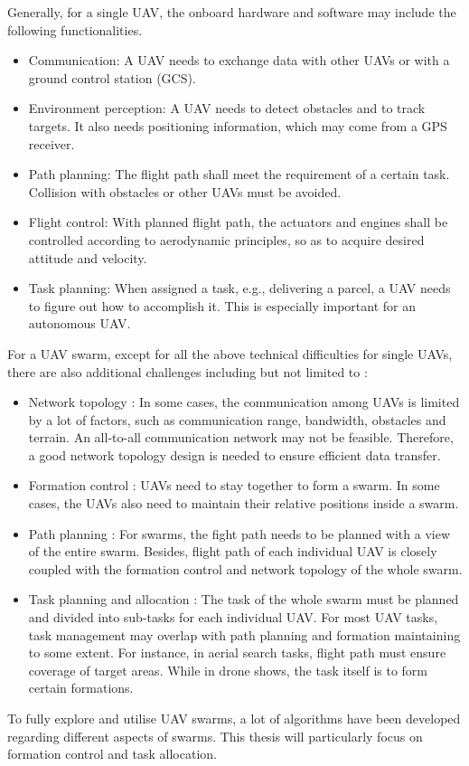 Generally, for a single UAV,
the onboard hardware and software may include the following functionalities.
\begin{itemize}
    \item Communication:
    A UAV needs to exchange data with other UAVs or with a ground control station (GCS).
    \item Environment perception:
    A UAV needs to detect obstacles and to track targets.
    It also needs positioning information, which may come from a GPS receiver.
    \item Path planning:
    The flight path shall meet the requirement of a certain task.
    Collision with obstacles or other UAVs must be avoided.
    \item Flight control:
    With planned flight path, the actuators and engines shall be controlled
    according to aerodynamic principles, so as to acquire desired attitude and velocity.
    \item Task planning:
    When assigned a task, e.g., delivering a parcel,
    a UAV needs to figure out how to accomplish it.
    This is especially important for an autonomous UAV.
\end{itemize}
For a UAV swarm, except for all the above technical difficulties for single UAVs,
there are also additional challenges including
but not limited to \parencite{Javed2024, Zhou2020, Brambilla2013}:
\begin{itemize}
  \item Network topology
  \parencite{Javed2024, Javaid2023, Chen2020, Campion2019, Brust2015}:
  In some cases, the communication among UAVs is limited by a lot of factors,
  such as communication range, bandwidth, obstacles and terrain.
  An all-to-all communication network may not be feasible.
  Therefore, a good network topology design is needed to ensure efficient data transfer.
  \item Formation control
  \parencite{Javed2024, Wan2023, Ouyang2023, Shahzad2023, Ma2022, Kamel2020}:
  UAVs need to stay together to form a swarm.
  In some cases, the UAVs also need to maintain their relative positions inside a swarm.
  \item Path planning
  \parencite{Javed2024, Dimakos2024, PuenteCastro2022}:
  For swarms, the fight path needs to be planned with a view of the entire swarm.
  Besides, flight path of each individual UAV is closely coupled with
  the formation control and network topology of the whole swarm.
  \item Task planning and allocation
  \cite{Cao2024, Javed2024, Li2023, Peng2021, Ma2022}:
  The task of the whole swarm must be planned and
  divided into sub-tasks for each individual UAV.
  For most UAV tasks, task management may overlap with path planning and
  formation maintaining to some extent. For instance, in aerial search tasks,
  flight path must ensure coverage of target areas.
  While in drone shows, the task itself is to form certain formations.
\end{itemize}
To fully explore and utilise UAV swarms,
a lot of algorithms have been developed regarding different aspects of swarms.
This thesis will particularly focus on formation control and task allocation.

